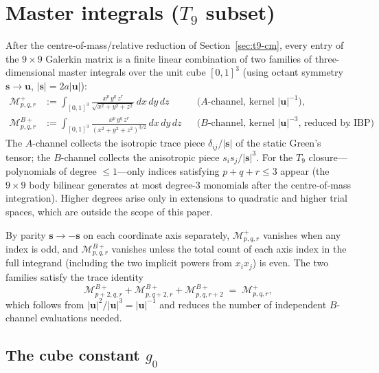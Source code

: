 \documentclass[11pt,a4paper]{article}
\newcommand{\bs}{\bm{s}}
\newcommand{\bu}{\bm{u}}
\theoremstyle{plain}
\theoremstyle{definition}
\theoremstyle{remark}
\begin{document}
\appendix
\section{Master integrals (\texorpdfstring{$T_9$}{T9} subset)}\label{app:masters}

After the centre-of-mass/relative reduction of Section~\ref{sec:t9-cm},
every entry of the $9\times 9$ Galerkin matrix is a finite linear
combination of two families of three-dimensional master integrals over the
unit cube $[0,1]^3$ (using octant symmetry $\bs \to \bu$, $|\bs|=2a|\bu|$):
\begin{align}
  \mathcal{M}^+_{p,q,r}
  &:= \int_{[0,1]^3}\!\frac{x^p\,y^q\,z^r}{\sqrt{x^2+y^2+z^2}}\,
      dx\,dy\,dz
  &&\text{($A$-channel, kernel $|\bu|^{-1}$)},
  \label{eq:Mp-app}\\
  \mathcal{M}^{B+}_{p,q,r}
  &:= \int_{[0,1]^3}\!\frac{x^p\,y^q\,z^r}{(x^2+y^2+z^2)^{3/2}}\,
      dx\,dy\,dz
  &&\text{($B$-channel, kernel $|\bu|^{-3}$, reduced by IBP)}.
  \label{eq:MpB-app}
\end{align}
The $A$-channel collects the isotropic trace piece $\delta_{ij}/|\bs|$ of
the static Green's tensor; the $B$-channel collects the anisotropic piece
$s_is_j/|\bs|^3$.  For the $T_9$ closure---polynomials of degree $\le 1$---only
indices satisfying $p+q+r \le 3$ appear (the $9\times9$ body bilinear
generates at most degree-3 monomials after the centre-of-mass integration).
Higher degrees arise only in extensions to quadratic and higher trial spaces,
which are outside the scope of this paper.

By parity $\bs \to -\bs$ on each coordinate axis separately,
$\mathcal{M}^+_{p,q,r}$ vanishes when any index is odd, and
$\mathcal{M}^{B+}_{p,q,r}$ vanishes unless the total count of each axis
index in the full integrand (including the two implicit powers from
$x_i x_j$) is even.  The two families satisfy the trace identity
\begin{equation}
  \mathcal{M}^{B+}_{p+2,q,r}
  + \mathcal{M}^{B+}_{p,q+2,r}
  + \mathcal{M}^{B+}_{p,q,r+2}
  \;=\; \mathcal{M}^+_{p,q,r},
  \label{eq:trace-id}
\end{equation}
which follows from $|\bu|^2/|\bu|^3 = |\bu|^{-1}$ and reduces the number
of independent $B$-channel evaluations needed.

\subsection*{The cube constant \texorpdfstring{$g_0$}{g0}}
\end{document}
